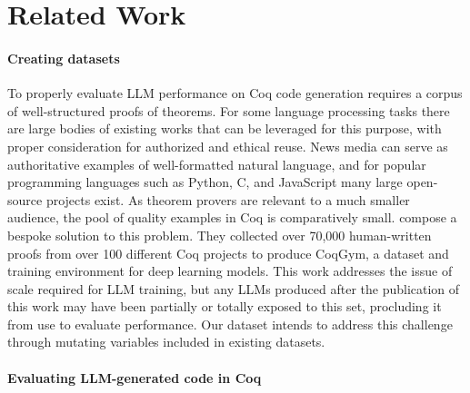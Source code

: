
\section{Related Work}
\label{sec:related-work}


\paragraph{Creating datasets}
To properly evaluate LLM performance on
Coq code generation requires a corpus of well-structured
proofs of theorems. For some language processing tasks
there are large bodies of existing works that can be leveraged for this purpose, 
with proper consideration for authorized and ethical reuse.
News media can serve as authoritative examples of
well-formatted natural language, and for popular programming
languages such as Python, C, and JavaScript many large
open-source projects exist.
As theorem provers are relevant to a much smaller audience, the pool of quality examples in Coq is
comparatively small.
\citet{learningtoprove} compose a bespoke solution
to this problem. They collected over 70,000 human-written proofs
from over 100 different Coq projects to produce CoqGym,
a dataset and training environment for deep learning models.
This work addresses the issue of scale required for LLM training,
but any LLMs produced
after the publication of this work
may have been partially or totally exposed to this set,
procluding it from use to evaluate performance.
Our dataset intends to address this challenge
through mutating variables included
in existing datasets.

\paragraph{Evaluating LLM-generated code in Coq}

